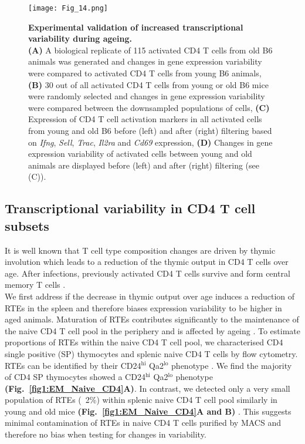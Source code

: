 \newpage

\begin{figure}[!ht]
\centering
\texttt{[image: Fig\_14.png]}
\caption[Experimental validation of increased transcriptional variability during ageing]{\textbf{Experimental validation of increased transcriptional variability during ageing.} \\
\textbf{(A)} A biological replicate of 115 activated CD4\plus{} T cells from old B6 animals was generated and changes in gene expression variability were compared to activated CD4\plus{} T cells from young B6 animals, 
\textbf{(B)} 30 out of all activated CD4\plus{} T cells from young or old B6 mice were randomly selected and changes in gene expression variability were compared between the downsampled populations of cells, 
\textbf{(C)} Expression of CD4\plus{} T cell activation markers in all activated cells from young and old B6 before (left) and after (right) filtering based on \textit{Ifng}, \textit{Sell}, \textit{Trac}, \textit{Il2ra} and \textit{Cd69} expression, 
\textbf{(D)} Changes in gene expression variability of activated cells between young and old animals are displayed before (left) and after (right) filtering (see (C)).}
\label{fig1:validation}
\end{figure}

\newpage

\subsection{Transcriptional variability in CD4\plus{} T cell subsets}

It is well known that T cell type composition changes are driven by thymic involution which leads to a reduction of the thymic output in CD4\plus{} T cells over age. 
After infections, previously activated CD4\plus{} T cells survive and form central memory T cells \cite{Moro-Garcia2013}.\\

We first address if the decrease in thymic output over age induces a reduction of \glspl{RTE} in the spleen and therefore biases expression variability to be higher in aged animals. 
Maturation of RTEs contributes significantly to the maintenance of the naive CD4\plus{} T cell pool in the periphery and is affected by ageing \citep{Boursalian2004, Hale2006, Fink2013}. 
To estimate proportions of RTEs within the naive CD4\plus{} T cell pool, we characterised CD4 single positive (SP) thymocytes and splenic naive CD4\plus{} T cells by flow cytometry. 
RTEs can be identified by their CD24$^{\text{hi}}$ Qa2$^{\text{lo}}$ phenotype \citep{Boursalian2004, Hale2006}. 
We find the  majority of CD4 SP thymocytes showed a CD24$^\text{hi}$ Qa2$^\text{lo}$ phenotype \textbf{(Fig.~\ref{fig1:EM_Naive_CD4}A)}. 
In contrast, we detected only a very small population of RTEs (~2\%) within splenic naive CD4\plus{} T cell pool similarly in young and old mice \textbf{(Fig.~\ref{fig1:EM_Naive_CD4}A and B)} \citep{Hale2006}. 
This suggests minimal contamination of RTEs in naive CD4\plus{} T cells purified by MACS and therefore no bias when testing for changes in variability.\\

